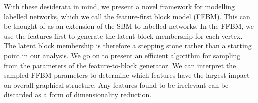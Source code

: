 With these desiderata in mind, we present a novel framework for modelling labelled networks, which we call the feature-first block model (FFBM). This can be thought of as an extension of the SBM to labelled networks. In the FFBM, we use the features first to generate the latent block membership for each vertex. The latent block membership is therefore a stepping stone rather than a starting point in our analysis. We go on to present an efficient algorithm for sampling from the parameters of the feature-to-block generator. We can interpret the sampled FFBM parameters to determine which features have the largest impact on overall graphical structure. Any features found to be irrelevant can be discarded as a form of dimensionality reduction.